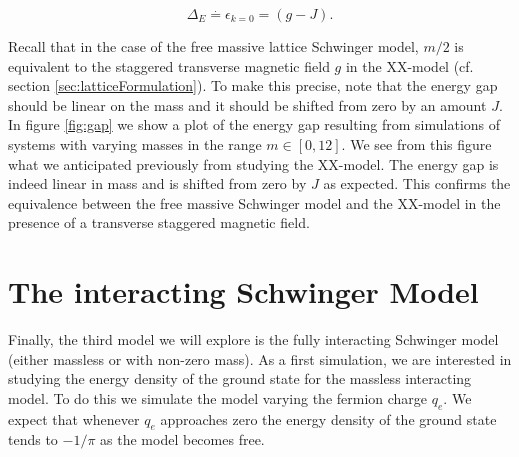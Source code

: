 \begin{equation}
	   \Delta_E \overset{.}{=} \epsilon_{k=0} = (g - J).
\end{equation}
 
 Recall	 that in the case of the free massive lattice Schwinger model, $m/2$ is equivalent to the staggered transverse magnetic field $g$ in the XX-model (cf. section \ref{sec:latticeFormulation}). To make this precise, note that the energy gap should be linear on the mass and it should be shifted from zero by an amount $J$. In figure \ref{fig:gap} we show a plot of the energy gap resulting from simulations of systems with varying masses in the range $m\in [0,12]$. We see from this figure what we anticipated previously from studying the XX-model. The energy gap is indeed linear in mass and is shifted from zero by $J$ as expected. This confirms the equivalence between the free massive Schwinger model and the XX-model in the presence of a transverse staggered magnetic field.



\section{The interacting Schwinger Model}

Finally, the third model we will explore is the fully interacting Schwinger model (either massless or with non-zero mass). As a first simulation, we are interested in studying the energy density of the ground state for the massless interacting model. To do this we simulate the model varying the fermion charge $q_e$. We expect that whenever $q_e$ approaches zero the energy density of the ground state tends to $-1/\pi$ as the model becomes free.\\ 

